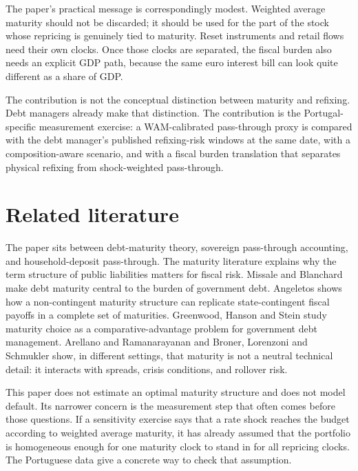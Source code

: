 \documentclass[11pt,a4paper]{article}
\begin{document}
The paper's practical message is correspondingly modest. Weighted average
maturity should not be discarded; it should be used for the part of the stock
whose repricing is genuinely tied to maturity. Reset instruments and retail
flows need their own clocks. Once those clocks are separated, the fiscal
burden also needs an explicit GDP path, because the same euro interest bill can
look quite different as a share of GDP.

The contribution is not the conceptual distinction between maturity and
refixing. Debt managers already make that distinction. The contribution is the
Portugal-specific measurement exercise: a WAM-calibrated pass-through proxy is
compared with the debt manager's published refixing-risk windows at the same
date, with a composition-aware scenario, and with a fiscal burden translation
that separates physical refixing from shock-weighted pass-through.

\section{Related literature}
\label{sec:literature}

The paper sits between debt-maturity theory, sovereign pass-through accounting,
and household-deposit pass-through. The maturity literature explains why the
term structure of public liabilities matters for fiscal risk. Missale and
Blanchard \cite{missale1994} make debt maturity central to the burden of
government debt. Angeletos \cite{angeletos2002} shows how a non-contingent
maturity structure can replicate state-contingent fiscal payoffs in a complete
set of maturities. Greenwood, Hanson and Stein \cite{greenwood2015} study
maturity choice as a comparative-advantage problem for government debt
management. Arellano and Ramanarayanan \cite{arellano2012} and Broner,
Lorenzoni and Schmukler \cite{broner2013} show, in different settings, that
maturity is not a neutral technical detail: it interacts with spreads, crisis
conditions, and rollover risk.

This paper does not estimate an optimal maturity structure and does not model
default. Its narrower concern is the measurement step that often comes before
those questions. If a sensitivity exercise says that a rate shock reaches the
budget according to weighted average maturity, it has already assumed that the
portfolio is homogeneous enough for one maturity clock to stand in for all
repricing clocks. The Portuguese data give a concrete way to check that
assumption.
\end{document}
